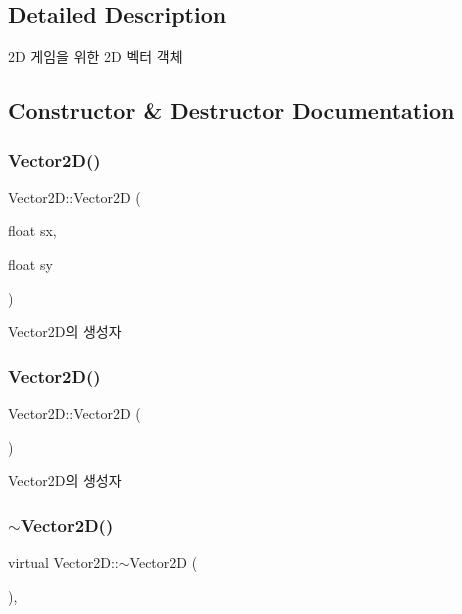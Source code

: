 \subsection{Detailed Description}
2D 게임을 위한 2D 벡터 객체 

\subsection{Constructor \& Destructor Documentation}
\mbox{\label{class_vector2_d_a5247181f09f861314692815978fc5f52}} 
\subsubsection{\texorpdfstring{Vector2D()}{Vector2D()}\hspace{0.1cm}{\footnotesize\ttfamily [1/2]}}
{\footnotesize\ttfamily Vector2\+D\+::\+Vector2D (\begin{DoxyParamCaption}\item[{float}]{sx,  }\item[{float}]{sy }\end{DoxyParamCaption})\hspace{0.3cm}{\ttfamily [inline]}}

Vector2\+D의 생성자 \mbox{\label{class_vector2_d_a98e9997ebb7a629f4db52397d4e0d653}} 
\subsubsection{\texorpdfstring{Vector2D()}{Vector2D()}\hspace{0.1cm}{\footnotesize\ttfamily [2/2]}}
{\footnotesize\ttfamily Vector2\+D\+::\+Vector2D (\begin{DoxyParamCaption}{ }\end{DoxyParamCaption})\hspace{0.3cm}{\ttfamily [inline]}}

Vector2\+D의 생성자 \mbox{\label{class_vector2_d_aed227f1380bf056fd75ba9b3df7a6511}} 
\subsubsection{\texorpdfstring{$\sim$Vector2D()}{~Vector2D()}}
{\footnotesize\ttfamily virtual Vector2\+D\+::$\sim$\+Vector2D (\begin{DoxyParamCaption}{ }\end{DoxyParamCaption})\hspace{0.3cm}{\ttfamily [inline]}, {\ttfamily [virtual]}}

